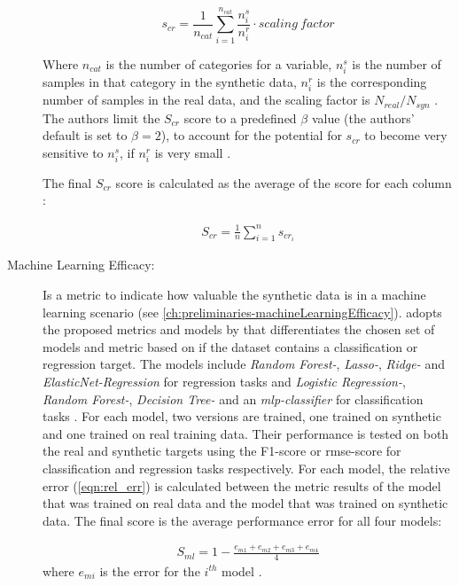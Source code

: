 \begin{description}
  $$ s_{cr} = \frac{1}{n_{cat}} \sum_{i=1}^{n_{cat}} \frac{n^s_i}{n^r_i} \cdot scaling~factor $$

  Where $n_{cat}$ is the number of categories for a variable, $n^s_i$ is the number of samples in that category in the synthetic data, $n^r_i$ is the corresponding number of samples in the real data, and the scaling factor is $N_{real}/N_{syn}$ \cite{chundawat2022UniversalMetricRobust}.
  The authors limit the $S_{cr}$ score to a predefined $\beta$ value (the authors' default is set to $\beta=2$), to account for the potential for $s_{cr}$ to become very sensitive to $n^s_i$, if $n^r_i$ is very small \cite{chundawat2022UniversalMetricRobust}.

  The final $S_{cr}$ score is calculated as the average of the score for each column \cite{chundawat2022UniversalMetricRobust}:

  \begin{equation}
    \begin{align*}
      \label{eqn:s_cr}
      S_{cr} = \frac{1}{n} \sum_{i=1}^{n} s_{cr_i}
      \end{align*}
  \end{equation}



  \item[Machine Learning Efficacy:]
  Is a metric to indicate how valuable the synthetic data is in a machine learning scenario (see \autoref{ch:preliminaries-machineLearningEfficacy}).
  \cite{chundawat2022UniversalMetricRobust} adopts the proposed metrics and models by \cite{brenninkmeijer2019GenerationEvaluationTabular} that differentiates the chosen set of models and metric based on
  if the dataset contains a classification or regression target.
  The models include \textit{Random Forest-}, \textit{Lasso-}, \textit{Ridge-} and \textit{ElasticNet-Regression} for regression tasks and \textit{Logistic Regression-}, \textit{Random Forest-},  \textit{Decision Tree-} and an \textit{\gls{mlp}-classifier} for classification tasks \cite{brenninkmeijer2019GenerationEvaluationTabular, chundawat2022UniversalMetricRobust}.
  For each model, two versions are trained, one trained on synthetic and one trained on real training data.
  Their performance is tested on both the real and synthetic targets using the F1-score or \gls{rmse}-score for classification and regression tasks respectively.
  For each model, the relative error (\autoref{eqn:rel_err}) is calculated between the metric results of the model that was trained on real data and the model that was trained on synthetic data.
  The final score is the average performance error for all four models:

  \begin{equation}
    \begin{align*}
      \label{eqn:s_ml}
      S_{ml} = 1-\frac{e_{m1}+e_{m2}+e_{m3}+e_{m4}}{4}
      \end{align*}
  \end{equation}
  where $e_{mi}$ is the error for the $i^{th}$ model \cite{chundawat2022UniversalMetricRobust}.
\end{description}

